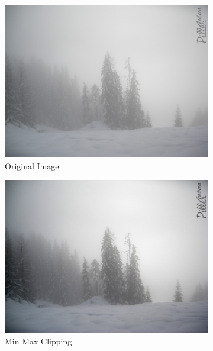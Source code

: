 \documentclass[a4paper]{article}
\begin{document}
\begin{figure}[H]
    \hfill
    \centering
    \begin{subfigure}[b]{.225\textwidth}
        \centering
        \includegraphics[width=\textwidth]{media/fog.jpg}
        \caption{Original Image}
    \end{subfigure}
    \hfill
    \begin{subfigure}[b]{.225\textwidth}
        \centering
        \includegraphics[width=\textwidth]{output/fog_contrast.jpg}
        \caption{Min Max Clipping}
    \end{subfigure}
    \hfill
    \begin{subfigure}[b]{.225\textwidth}
        \centering

\end{subfigure}
\end{figure}
\end{document}
